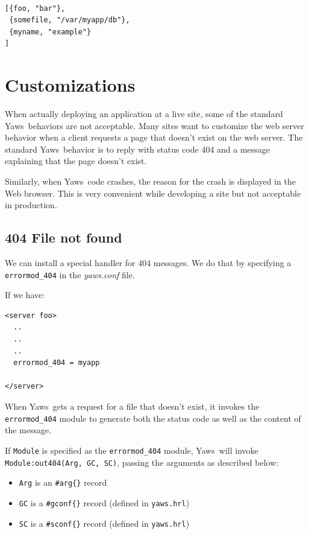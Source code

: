 \documentclass[11pt,oneside,english]{book}
\newcommand{\Yaws}            %
        {{\sc Yaws}}
\begin{document}
\begin{verbatim}

[{foo, "bar"},
 {somefile, "/var/myapp/db"},
 {myname, "example"}
]

\end{verbatim}


\section{Customizations}

When actually deploying an application at a live site, some of the
standard \Yaws\ behaviors are not acceptable. Many sites want to
customize the web server behavior when a client requests a page that
doesn't exist on the web server. The standard \Yaws\ behavior is to
reply with status code 404 and a message explaining that the page
doesn't exist.

Similarly, when \Yaws\  code crashes, the reason for the crash is
displayed in the Web browser. This is very convenient while
developing a site but not acceptable in production.


\subsection{404 File not found}

We can install a special handler for 404 messages. We do that by
specifying a \verb+errormod_404+ in the \textit{yaws.conf} file.

If we have:

\begin{verbatim}
<server foo>
  ..
  ..
  ..
  errormod_404 = myapp

</server>

\end{verbatim}

When \Yaws\ gets a request for a file that doesn't exist, it invokes
the \verb+errormod_404+ module to generate both the status code as
well as the content of the message.

If \verb+Module+ is specified as the \verb+errormod_404+ module,
\Yaws\ will invoke \verb+Module:out404(Arg, GC, SC)+, passing the
arguments as described below:

\begin{itemize}
\item \verb+Arg+ is an \verb+#arg{}+ record

\item \verb+GC+ is a \verb+#gconf{}+ record (defined in \verb+yaws.hrl+)

\item \verb+SC+ is a \verb+#sconf{}+ record (defined in
  \verb+yaws.hrl+)
\end{itemize}
\end{document}
